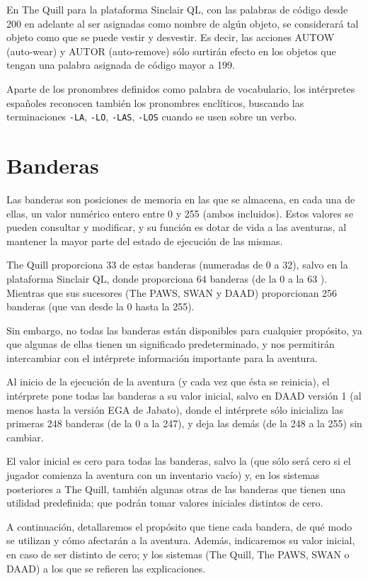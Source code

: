 \documentclass[11pt, a5paper]{article}
\newcommand{\quill}{\textsf{The Quill}\xspace}
\newcommand{\paw}{\textsf{The PAWS}\xspace}
\newcommand{\swan}{\textsf{SWAN}\xspace}
\newcommand{\daad}{\textsf{DAAD}\xspace}
\begin{document}
En \quill para la plataforma Sinclair QL, con las palabras de código desde 200 en adelante al ser asignadas como nombre de algún objeto, se considerará tal objeto como que se puede vestir y desvestir. Es decir, las acciones AUTOW (auto-wear) y AUTOR (auto-remove) sólo surtirán efecto en los objetos que tengan una palabra asignada de código mayor a 199.

Aparte de los pronombres definidos como palabra de vocabulario, los intérpretes españoles reconocen también los pronombres enclíticos, buscando las terminaciones \texttt{-LA}, \texttt{-LO}, \texttt{-LAS}, \texttt{-LOS} cuando se usen sobre un verbo.


\section{Banderas}

Las banderas son posiciones de memoria en las que se almacena, en cada una de ellas, un valor numérico entero entre 0 y 255 (ambos incluidos). Estos valores se pueden consultar y modificar, y su función es dotar de vida a las aventuras, al mantener la mayor parte del estado de ejecución de las mismas.

\quill proporciona 33 de estas banderas (numeradas de 0 a 32), salvo en la plataforma Sinclair QL, donde proporciona 64 banderas (de la 0 a la 63 \cite{QuillQL}). Mientras que sus sucesores (\paw, \swan y \daad) proporcionan 256 banderas (que van desde la 0 hasta la 255).

Sin embargo, no todas las banderas están disponibles para cualquier propósito, ya que algunas de ellas tienen un significado predeterminado, y nos permitirán intercambiar con el intérprete información importante para la aventura.

Al inicio de la ejecución de la aventura (y cada vez que ésta se reinicia), el intérprete pone todas las banderas a su valor inicial, salvo en \daad versión 1 (al menos hasta la versión EGA de Jabato), donde el intérprete sólo inicializa las primeras 248 banderas (de la 0 a la 247), y deja las demás (de la 248 a la 255) sin cambiar.

El valor inicial es cero para todas las banderas, salvo la \textbf{} (que sólo será cero si el jugador comienza la aventura con un inventario vacío) y, en los sistemas posteriores a \quill, también algunas otras de las banderas que tienen una utilidad predefinida; que podrán tomar valores iniciales distintos de cero.

A continuación, detallaremos el propósito que tiene cada bandera, de qué modo se utilizan y cómo afectarán a la aventura. Además, indicaremos su valor inicial, en caso de ser distinto de cero; y los sistemas (\quill, \paw, \swan o \daad) a los que se refieren las explicaciones.
\end{document}
